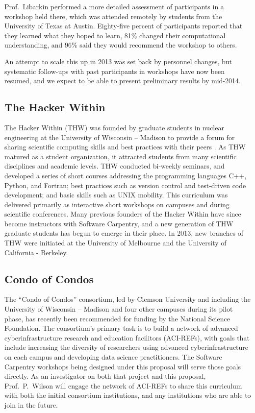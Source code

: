 \documentclass{proposalnsf}
\newlength{\up}
\begin{document}
Prof.\ Libarkin performed a more detailed assessment of participants
in a workshop held there, which was attended remotely by students from
the University of Texas at Austin. Eighty-five percent of participants
reported that they learned what they hoped to learn, 81\% changed
their computational understanding, and 96\% said they would recommend
the workshop to others.

An attempt to scale this up in 2013 was set back by personnel changes,
but systematic follow-ups with past participants in workshops have now
been resumed, and we expect to be able to present preliminary results
by mid-2014.

\subsection{The Hacker Within}
\label{sec:THW}

The Hacker Within (THW) was founded by graduate students in nuclear
engineering at the University of Wisconsin -- Madison to provide a
forum for sharing scientific computing skills and best practices with
their peers \cite{huff2011}. As THW matured as a student organization,
it attracted students from many scientific disciplines and academic
levels. THW conducted bi-weekly seminars, and developed a series of
short courses addressing the programming languages C++, Python, and
Fortran; best practices such as version control and test-driven code
development; and basic skills such as UNIX mobility. This curriculum
was delivered primarily as interactive short workshops on campuses and
during scientific conferences. Many previous founders of the Hacker
Within have since become instructors with Software Carpentry, and a
new generation of THW graduate students has begun to emerge in their
place. In 2013, new branches of THW were initiated at the University
of Melbourne and the University of California - Berkeley.

\subsection{Condo of Condos}
\label{sec:CofC}

The ``Condo of Condos'' consortium, led by Clemson University and
including the University of Wisconsin -- Madison and four other
campuses during its pilot phase, has recently been recommended for
funding by the National Science Foundation.  The consortium's primary
task is to build a network of advanced cyberinfrastructure research
and education facilitors (ACI-REFs), with goals that include
increasing the diversity of researchers using advanced
cyberinfrastructure on each campus and developing data science
practitioners.  The Software Carpentry workshops being designed under
this proposal will serve those goals directly.  As an investigator on
both that project and this proposal, Prof.\ P.\ Wilson will engage the
network of ACI-REFs to share this curriculum with both the initial
consortium institutions, and any institutions who are able to join in
the future.
\end{document}

